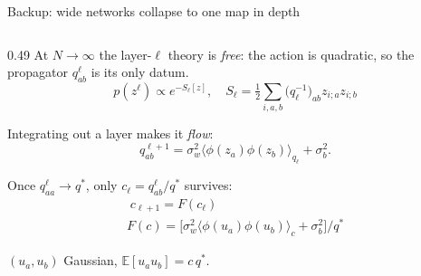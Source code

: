 \documentclass[aspectratio=169,10pt]{beamer}
\newcommand{\E}{\mathbb{E}}
\begin{document}
\begin{frame}{Backup: wide networks collapse to one map in depth}
  \begingroup
  \small
  \begin{columns}[T,onlytextwidth]
    \begin{column}{0.49\textwidth}
      At \(N\to\infty\) the layer-\(\ell\) theory is \emph{free}: the action
      is quadratic, so the propagator \(q^\ell_{ab}\) is its only datum.
      \vspace{-0.10em}
      \[
        p(z^\ell)\propto e^{-S_\ell[z]},\quad
        S_\ell=\tfrac12\textstyle\sum_{i,a,b}\big(q_\ell^{-1}\big)_{ab}
          z_{i;a}z_{i;b}
      \]

      \vspace{-0.25em}
      Integrating out a layer makes it \emph{flow}:
      \vspace{-0.15em}
      \[
        q^{\ell+1}_{ab}=\sigma_w^2\big\langle\phi(z_a)\phi(z_b)
          \big\rangle_{q_\ell}+\sigma_b^2 .
      \]

      \vspace{-0.20em}
      Once \(q^\ell_{aa}\to q^*\), only \(c_\ell=q^\ell_{ab}/q^*\) survives:
      \vspace{-0.15em}
      \[
        \begin{gathered}
          \boxed{\;c_{\ell+1}=F(c_\ell)\;}\\[0.20em]
          F(c)=\big[\sigma_w^2\big\langle\phi(u_a)\phi(u_b)\big\rangle_c
            +\sigma_b^2\big]\big/q^*
        \end{gathered}
      \]

      \vspace{-0.20em}
      {\footnotesize\color{muted}\((u_a,u_b)\) Gaussian,
      \(\E[u_au_b]=c\,q^*\).}
    \end{column}


\end{columns}
\end{frame}
\end{document}
